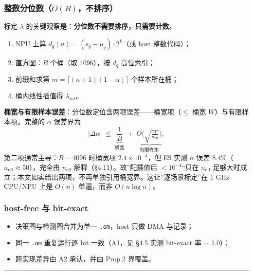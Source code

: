 \subsubsection{\texorpdfstring{整数分位数（\(O(B)\)，不排序）}{整数分位数（O(B)，不排序）}}\label{ux6574ux6570ux5206ux4f4dux6570obux4e0dux6392ux5e8f}

标定 \(\lambda\) 的关键观察是：\textbf{分位数不需要排序，只需要计数}。

\begin{enumerate}
\def\labelenumi{\arabic{enumi}.}
\tightlist
\item
  NPU 上算 \(d_q(u)=(s_q-\mu_q)\cdot 2^{k}\)（或 host 整数代码）；
\item
  直方图：\(B\) 个桶（取 4096），按 \(d_q\) 高位索引；
\item
  前缀和求第 \(m=\lceil(n+1)(1-\alpha)\rceil\) 个样本所在桶；
\item
  桶内线性插值得 \(\lambda_{int}\)。
\end{enumerate}

\textbf{桶宽与有限样本误差}：分位数定位含两项误差------桶宽项（\(\le\)
桶宽 \(W\)）与有限样本项。完整的 \(\alpha\) 误差界为 \[
|\Delta\alpha|\;\le\;\underbrace{\frac{1}{B}}_{\text{桶宽}}\;+\;\underbrace{O\!\Big(\sqrt{\tfrac{\alpha}{n_{\mathrm{eff}}}}\Big)}_{\text{有限样本}},
\tag{3.23}
\] 第二项通常主导：\(B=4096\) 时桶宽项 \(2.4\times10^{-4}\)，但 E9 实测
\(\alpha\) 误差 \(8.4\%\)（\(n_{\mathrm{eff}}\approx50\)），完全由
\(n_{\mathrm{eff}}\) 解释（§4.11）。故''配插值后 \(<10^{-4}\)``只在
\(n_{\mathrm{eff}}\)
足够大时成立；本文如实给出两项，不再单独引用桶宽界。这让''逐场景标定''在
1 GHz CPU/NPU 上是 \(O(n)\) 单遍，而非 \(O(n\log n)\)。

\subsubsection{host-free 与 bit-exact}\label{host-free-ux4e0e-bit-exact}

\begin{itemize}
\tightlist
\item
  决策图与检测图合并为单一 \texttt{.om}，host 只做 DMA 与记录；
\item
  同一 \texttt{.om} 重复运行逐 bit 一致（A1，见 §4.5 实测 bit-exact 率 =
  1.0）；
\item
  跨实现差异由 A2 承认，并由 Prop.2 界覆盖。
\end{itemize}

\begin{center}\rule{0.5\linewidth}{0.5pt}\end{center}


